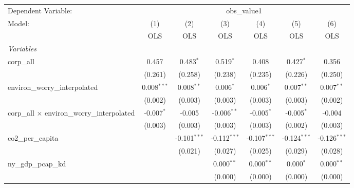 
\begingroup
\centering
\begin{tabular}{lcccccc}
   \toprule
   Dependent Variable: & \multicolumn{6}{c}{obs\_value1}\\
   Model:                                              & (1)           & (2)            & (3)            & (4)            & (5)            & (6)\\  
                                                       &  OLS          & OLS            & OLS            & OLS            & OLS            & OLS\\  
   \midrule
   \emph{Variables}\\
   corp\_all                                           & 0.457         & 0.483$^{*}$    & 0.519$^{*}$    & 0.408          & 0.427$^{*}$    & 0.356\\   
                                                       & (0.261)       & (0.258)        & (0.238)        & (0.235)        & (0.226)        & (0.250)\\   
   environ\_worry\_interpolated                        & 0.008$^{***}$ & 0.008$^{**}$   & 0.006$^{*}$    & 0.006$^{*}$    & 0.007$^{**}$   & 0.007$^{**}$\\   
                                                       & (0.002)       & (0.003)        & (0.003)        & (0.003)        & (0.003)        & (0.002)\\   
   corp\_all $\times$ environ\_worry\_interpolated     & -0.007$^{*}$  & -0.005         & -0.006$^{**}$  & -0.005$^{*}$   & -0.005$^{*}$   & -0.004\\   
                                                       & (0.003)       & (0.003)        & (0.003)        & (0.003)        & (0.002)        & (0.003)\\   
   co2\_per\_capita                                    &               & -0.101$^{***}$ & -0.112$^{***}$ & -0.107$^{***}$ & -0.124$^{***}$ & -0.126$^{***}$\\   
                                                       &               & (0.021)        & (0.027)        & (0.025)        & (0.029)        & (0.028)\\   
   ny\_gdp\_pcap\_kd                                   &               &                & 0.000$^{**}$   & 0.000$^{**}$   & 0.000$^{*}$    & 0.000$^{**}$\\   
                                                       &               &                & (0.000)        & (0.000)        & (0.000)        & (0.000)\\   

\end{tabular}
